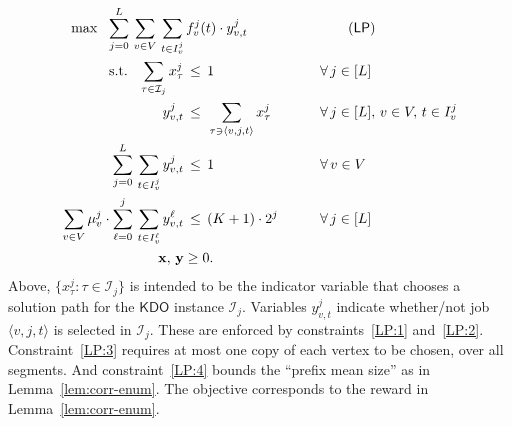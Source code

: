 \documentclass[11pt,letterpaper]{article}
\numberwithin{algorithm}{section}
\newcommand{\I}{{\mathcal{I}}}
\newcommand{\kdo}{\ensuremath{\mathsf{KDO}}\xspace}
\newcommand{\lp}{\ensuremath{\mathsf{LP}}\xspace}
\begin{document}
\begin{alignat}{2}
  \mbox{max } \,\, \sum_{j=0}^L \, \sum_{v \in V}  \, \sum_{t \in I^j_v} &  \, f^j_v(t)\cdot y^j_{v,t}  & & \label{LP:0} \tag{\lp}  \\
  \mbox{s.t. } \,\, \sum_{\tau \in \I_j} x^j_{\tau} &  \, \le  \, 1 & \qquad & \forall \, j \in [L]   \label{LP:1} \\
  y^j_{v,t} & \, \leq  \,  \, \sum_{\tau\ni \langle v,j,t\rangle} x^j_\tau & \qquad & \forall \, j\in [L],\, v \in
  V, \, t\in I^j_v \label{LP:2} \\
  \sum_{j=0}^L  \, \sum_{t\in I^j_v} y^j_{v,t} & \, \leq  \, 1 & \qquad & \forall \, v \in  V \label{LP:3} \\
  \sum_{v \in V} \mu^j_v\cdot \sum_{\ell=0}^j  \, \sum_{t \in I^\ell_v}  y^\ell_{v,t} & \, \leq  \, (K+1)\cdot 2^j & \qquad & \forall \, j \in [L] \label{LP:4} \\
  \mathbf{x},\, \mathbf{y} &\geq 0. & & \label{LP:5}
\end{alignat}
Above, $\{x^j_\tau: \tau\in \I_j\}$ is intended to be the indicator variable that chooses a solution path for the \kdo instance $\I_j$. Variables $y^j_{v,t}$ indicate whether/not job $\langle v,j,t\rangle$ is selected in $\I_j$. These are enforced by constraints~\eqref{LP:1} and~\eqref{LP:2}. Constraint~\eqref{LP:3} requires at most one copy of each vertex to be chosen, over all segments. And constraint~\eqref{LP:4} bounds the ``prefix mean size'' as in Lemma~\ref{lem:corr-enum}. The objective corresponds to the reward in  Lemma~\ref{lem:corr-enum}.
\end{document}
